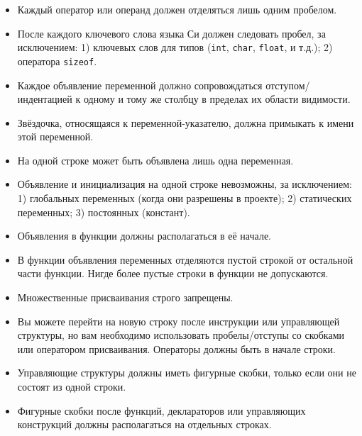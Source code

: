 \documentclass{42-ru}
\begin{document}
\begin{itemize}
                \item Каждый оператор или операнд должен отделяться лишь одним пробелом.

                \item После каждого ключевого слова языка Си должен следовать пробел, за исключением: 1) ключевых слов для типов (\texttt{int}, \texttt{char}, \texttt{float}, и т.д.); 2) оператора \texttt{sizeof}.

                \item Каждое объявление переменной должно сопровождаться отступом/индентацией к одному и тому же столбцу в пределах их области видимости.

                \item Звёздочка, относящаяся к переменной-указателю, должна примыкать к имени этой переменной.

                \item На одной строке может быть объявлена лишь одна переменная.

                \item Объявление и инициализация на одной строке невозможны, за исключением: 1) глобальных переменных (когда они разрешены в проекте); 2) статических переменных; 3) постоянных (констант).

                \item Объявления в функции должны располагаться в её начале.

                \item В функции объявления переменных отделяются пустой строкой от остальной части функции. Нигде более пустые строки в функции не допускаются.

                \item Множественные присваивания строго запрещены.

                \item Вы можете перейти на новую строку после инструкции или управляющей структуры, но вам необходимо использовать пробелы/отступы со скобками или оператором присваивания.
                    Операторы должны быть в начале строки.

                \item Управляющие структуры должны иметь фигурные скобки, только если они не состоят из одной строки.

                \item Фигурные скобки после функций, деклараторов или управляющих конструкций должны располагаться на отдельных строках.

            \end{itemize}
\end{document}
